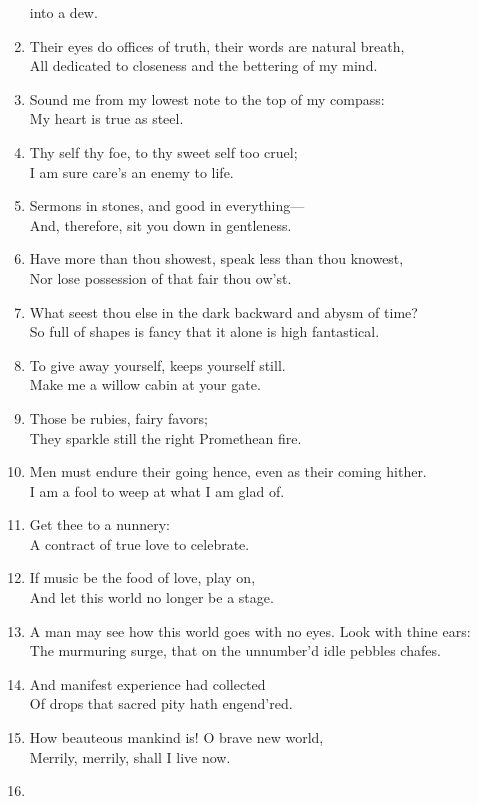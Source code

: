 \documentclass[17pt]{extarticle}
\begin{document}
\begin{enumerate}
  into a dew.
\item
  Their eyes do offices of truth, their words are natural breath,\\All
  dedicated to closeness and the bettering of my mind.
\item
  Sound me from my lowest note to the top of my compass:\\My heart is
  true as steel.
\item
  Thy self thy foe, to thy sweet self too cruel;\\I am sure care's an
  enemy to life.
\item
  Sermons in stones, and good in everything---\\And, therefore, sit you
  down in gentleness.
\item
  Have more than thou showest, speak less than thou knowest,\\Nor lose
  possession of that fair thou ow'st.
\item
  What seest thou else in the dark backward and abysm of time?\\So full
  of shapes is fancy that it alone is high fantastical.
\item
  To give away yourself, keeps yourself still.\\Make me a willow cabin
  at your gate.
\item
  Those be rubies, fairy favors;\\They sparkle still the right
  Promethean fire.
\item
  Men must endure their going hence, even as their coming hither.\\I am
  a fool to weep at what I am glad of.
\item
  Get thee to a nunnery:\\A contract of true love to celebrate.
\item
  If music be the food of love, play on,\\And let this world no longer
  be a stage.
\item
  A man may see how this world goes with no eyes. Look with thine
  ears:\\The murmuring surge, that on the unnumber'd idle pebbles
  chafes.
\item
  And manifest experience had collected\\Of drops that sacred pity hath
  engend'red.
\item
  How beauteous mankind is! O brave new world,\\Merrily, merrily, shall
  I live now.
\item

\end{enumerate}
\end{document}
